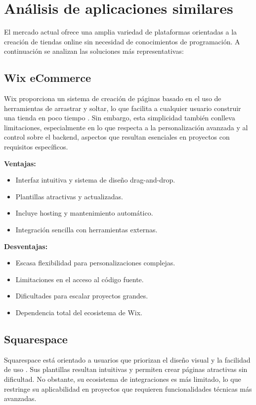 
\section{Análisis de aplicaciones similares}
El mercado actual ofrece una amplia variedad de plataformas orientadas a la creación de tiendas online sin necesidad de conocimientos de programación. A continuación se analizan las soluciones más representativas:

\subsection{Wix eCommerce}
Wix proporciona un sistema de creación de páginas basado en el uso de herramientas
de arrastrar y soltar, lo que facilita a cualquier usuario construir una tienda en poco
tiempo \cite{wixHelp}. Sin embargo, esta simplicidad también conlleva limitaciones, especialmente en lo
que respecta a la personalización avanzada y al control sobre el backend, aspectos que resultan esenciales en proyectos con requisitos específicos.

\textbf{Ventajas:}
\begin{itemize}
    \item Interfaz intuitiva y sistema de diseño drag-and-drop.
    \item Plantillas atractivas y actualizadas.
    \item Incluye hosting y mantenimiento automático.
    \item Integración sencilla con herramientas externas.
\end{itemize}

\textbf{Desventajas:}
\begin{itemize}
    \item Escasa flexibilidad para personalizaciones complejas.
    \item Limitaciones en el acceso al código fuente.
    \item Dificultades para escalar proyectos grandes.
    \item Dependencia total del ecosistema de Wix.
\end{itemize}

\subsection{Squarespace}
Squarespace está orientado a usuarios que priorizan el diseño visual y la facilidad de
uso \cite{squarespaceHelp}. Sus plantillas resultan intuitivas y permiten crear páginas atractivas sin dificultad. No
obstante, su ecosistema de integraciones es más limitado, lo que restringe su aplicabilidad
en proyectos que requieren funcionalidades técnicas más avanzadas.

